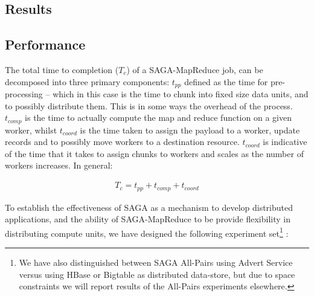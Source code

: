 \documentclass[conference,final]{IEEEtran}
\newcommand{\sagamapreduce }{SAGA-MapReduce }
\newcommand{\upp}{\vspace*{-0.5em}}
\begin{document}
\subsection*{Results}

\subsection{Performance} The total time to completion ($T_c$) of a
\sagamapreduce job, can be decomposed into three primary components:
$t_{pp}$ defined as the time for pre-processing -- which in this case
is the time to chunk into fixed size data units, and to possibly
distribute them. This is in some ways the overhead of the process.
$t_{comp}$ is the time to actually compute the map and reduce function
on a given worker, whilst $t_{coord}$ is the time taken to assign the
payload to a worker, update records and to possibly move workers to a
destination resource. $t_{coord}$ is indicative of the time that it
takes to assign chunks to workers and scales as the number of workers
increases. In general:

\vspace{-1em}
\begin{eqnarray}
T_c = t_{pp} + t_{comp} + t_{coord}
\end{eqnarray}

To establish the effectiveness of SAGA as a mechanism to develop
distributed applications, and the ability of \sagamapreduce to be
provide flexibility in distributing compute units, we have designed
the following experiment set\footnote{We have also distinguished
  between SAGA All-Pairs using Advert Service versus using HBase or
  Bigtable as distributed data-store, but due to space constraints we
  will report results of the All-Pairs experiments elsewhere.}  :



\end{document}
